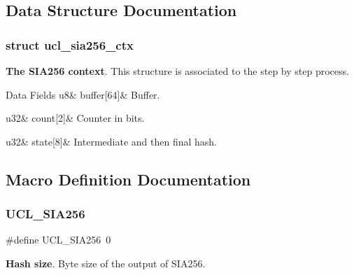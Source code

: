 \subsection{Data Structure Documentation}
\label{structucl__sia256__ctx}
\subsubsection{struct ucl\+\_\+sia256\+\_\+ctx}
{\bfseries The S\+I\+A256 context}. This structure is associated to the \textquotesingle{}step by step\textquotesingle{} process. \begin{DoxyFields}{Data Fields}
\mbox{\label{group___u_c_l___s_i_a256_a3aaaf77cfeea088172a742d19d1f9bcb}}
u8&
buffer\mbox{[}64\mbox{]}&
Buffer. \\
\hline

\mbox{\label{group___u_c_l___s_i_a256_a9d40863406b2429b1f43c9b90cff5cf5}}
u32&
count\mbox{[}2\mbox{]}&
Counter in bits. \\
\hline

\mbox{\label{group___u_c_l___s_i_a256_a7e2cf91d535966783b7d74bd0e891de9}}
u32&
state\mbox{[}8\mbox{]}&
Intermediate and then final hash. \\
\hline

\end{DoxyFields}


\subsection{Macro Definition Documentation}
\mbox{\label{group___u_c_l___s_i_a256_gaea9532ac144a90f3ee34ae129ed68282}}
\subsubsection{\texorpdfstring{U\+C\+L\+\_\+\+S\+I\+A256}{UCL\_SIA256}}
{\footnotesize\ttfamily \#define U\+C\+L\+\_\+\+S\+I\+A256~0}

{\bfseries Hash size}. Byte size of the output of S\+I\+A256. \mbox{\label{group___u_c_l___s_i_a256_ga34283058845b7379a0d481372e2ad4d9}}
